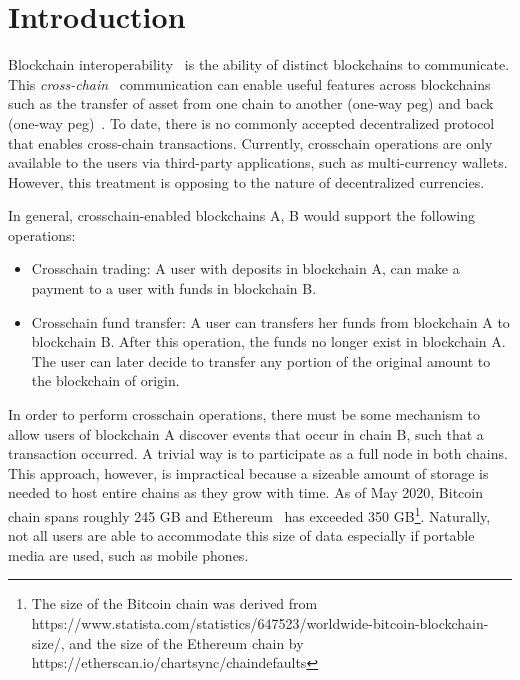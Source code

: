 \section{Introduction}

Blockchain interoperability~\cite{dionyziz} is the ability of distinct
blockchains to communicate.  This \emph{cross-chain}~\cite{pow-sidechains,
pos-sidechains,burn,crosschain-sok, gtklocker} communication can enable useful
features across blockchains such as the transfer of asset from one chain to
another (one-way peg) and back (one-way peg)~\cite{pow-sidechains}. To date,
there is no commonly accepted decentralized protocol that enables cross-chain
transactions.  Currently, crosschain operations are only available to the users
via third-party applications, such as multi-currency wallets. However, this
treatment is opposing to the nature of decentralized currencies.

\noindent

In general, crosschain-enabled blockchains A, B would support the following
operations:

\begin{itemize}
\item Crosschain trading: A user with deposits in blockchain A, can make a
    payment to a user with funds in blockchain B.
\item Crosschain fund transfer: A user can transfers her funds from blockchain
    A to blockchain B. After this operation, the funds no longer exist in
    blockchain A. The user can later decide to transfer any portion of the
    original amount to the blockchain of origin.
\end{itemize}


\noindent

In order to perform crosschain operations, there must be some mechanism to
allow users of blockchain A discover events that occur in chain B, such that a
transaction occurred. A trivial way is to participate as a full node in both
chains. This approach, however, is impractical because a sizeable amount of
storage is needed to host entire chains as they grow with time. As of May 2020,
Bitcoin~\cite{nakamoto} chain spans roughly 245 GB and Ethereum~\cite{wood,
    buterin} has exceeded 350 GB\footnote{The size of the Bitcoin chain was
    derived from
https://www.statista.com/statistics/647523/worldwide-bitcoin-blockchain-size/,
and the size of the Ethereum chain by
https://etherscan.io/chartsync/chaindefaults}. Naturally, not all users are
able to accommodate this size of data especially if portable media are used,
such as mobile phones.

